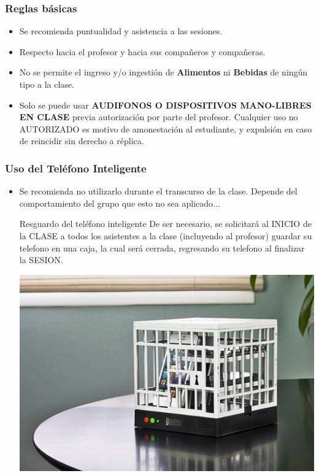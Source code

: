 
\begin{frame}
\frametitle{Reglas básicas}
\begin{itemize}
\item Se recomienda puntualidad y asistencia a las sesiones.
\item Respecto hacia el profesor y hacia sus compañeros y compañeras.  
\item No se permite el ingreso y/o ingestión de \textbf{Alimentos} ni \textbf{Bebidas} de ningún tipo a la clase. 
\item Solo se puede usar \textbf{AUDIFONOS O DISPOSITIVOS MANO-LIBRES EN CLASE} previa autorización por parte del profesor. Cualquier uso no AUTORIZADO es motivo de amonestación  al estudiante, y expulsión en caso de reincidir sin derecho a r\'eplica. 
\end{itemize}
\end{frame}

\begin{frame}
\frametitle{Uso del Teléfono Inteligente}
\begin{itemize}
\item Se recomienda no utilizarlo durante el transcurso de la clase. Depende del comportamiento del grupo que esto no sea aplicado...
\begin{block}{Resguardo del teléfono inteligente}
De ser necesario, se solicitará al INICIO de la CLASE a todos los asistentes a la clase (incluyendo al profesor) guardar su telefono en una caja, la cual será cerrada, regresando su telefono al finalizar la SESION.
\begin{center}
\includegraphics[width=0.35\linewidth]{ReglasBasicas/CajaFuerteCeluar.jpg}
\end{center}
\end{block}
\end{itemize}
\end{frame}


